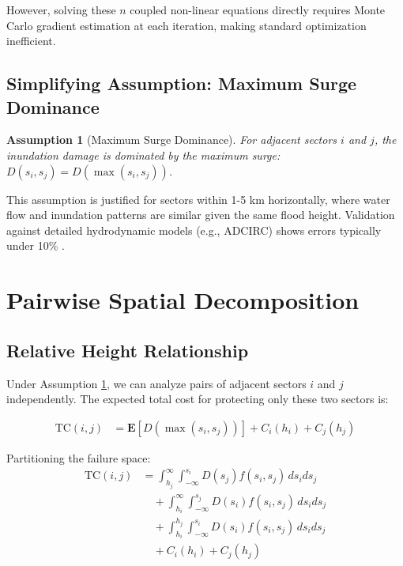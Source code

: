 \documentclass[3p,twocolumn]{elsarticle}
\newtheorem{assumption}{Assumption}[section]
\begin{document}
However, solving these $n$ coupled non-linear equations directly requires Monte Carlo gradient estimation at each iteration, making standard optimization inefficient.

\subsection{Simplifying Assumption: Maximum Surge Dominance}

\begin{assumption}[Maximum Surge Dominance]
\label{assum:max_surge}
For adjacent sectors $i$ and $j$, the inundation damage is dominated by the maximum surge: $D(s_i, s_j) = D(\max(s_i, s_j))$.
\end{assumption}

This assumption is justified for sectors within 1-5 km horizontally, where water flow and inundation patterns are similar given the same flood height. Validation against detailed hydrodynamic models (e.g., ADCIRC) shows errors typically under 10\% \cite{arns2020non}.

\section{Pairwise Spatial Decomposition}

\subsection{Relative Height Relationship}

Under Assumption \ref{assum:max_surge}, we can analyze pairs of adjacent sectors $i$ and $j$ independently. The expected total cost for protecting only these two sectors is:

\begin{align}
\text{TC}(i,j) &= \mathbf{E}[D(\max(s_i, s_j))] + C_i(h_i) + C_j(h_j)
\end{align}

Partitioning the failure space:
\begin{align}
\text{TC}(i,j) &= \int_{h_j}^{\infty} \int_{-\infty}^{s_i} D(s_j) f(s_i, s_j) \, ds_i ds_j \\
&\quad + \int_{h_i}^{\infty} \int_{-\infty}^{s_j} D(s_i) f(s_i, s_j) \, ds_i ds_j \\
&\quad + \int_{h_i}^{h_j} \int_{-\infty}^{s_i} D(s_i) f(s_i, s_j) \, ds_i ds_j \\
&\quad + C_i(h_i) + C_j(h_j)
\end{align}
\end{document}
